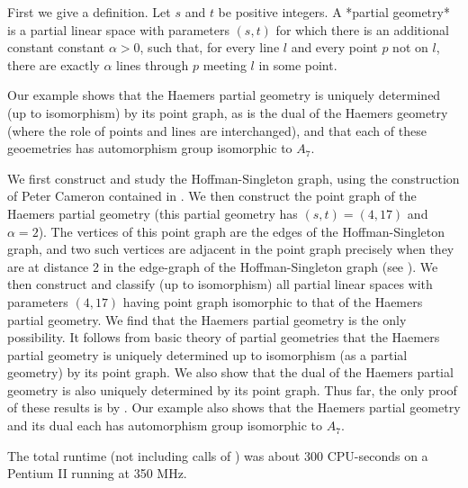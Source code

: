 First we give a definition. Let $s$ and $t$ be positive integers. A
*partial geometry* is a partial linear space with parameters $(s,t)$ for
which there is an additional constant constant $\alpha>0$, such that,
for every line $l$ and every point $p$ not on $l$, there are exactly
$\alpha$ lines through $p$ meeting $l$ in some point. 

Our example shows that the Haemers partial geometry \cite{Hae81}
is uniquely determined (up to isomorphism) by its point graph, as is
the dual of the Haemers geometry (where the role of points and lines
are interchanged), and that each of these geoemetries has automorphism
group isomorphic to $A_7$.

We first construct and study the Hoffman-Singleton graph, using the
construction of Peter Cameron contained in \cite{Cam99}.  We then
construct the point graph of the Haemers partial geometry \cite{Hae81}
(this partial geometry has $(s,t)=(4,17)$ and $\alpha=2$). The vertices
of this point graph are the edges of the Hoffman-Singleton graph, and
two such vertices are adjacent in the point graph precisely when they
are at distance 2 in the edge-graph of the Hoffman-Singleton graph (see
\cite{Hae81}).  We then construct and classify (up to isomorphism)
all partial linear spaces with parameters $(4,17)$ having point graph
isomorphic to that of the Haemers partial geometry. We find that
the Haemers partial geometry is the only possibility. It follows from
basic theory of partial geometries that the Haemers partial geometry is
uniquely determined up to isomorphism (as a partial geometry) by its point
graph. We also show that the dual of the Haemers partial geometry is also
uniquely determined by its point graph. Thus far, the only proof of these
results is by {\GRAPE}. Our example also shows that the Haemers partial
geometry and its dual each has automorphism group isomorphic to $A_7$.

The total runtime (not including calls of {\nauty}) was about 300
CPU-seconds on a Pentium II running at 350 MHz.

